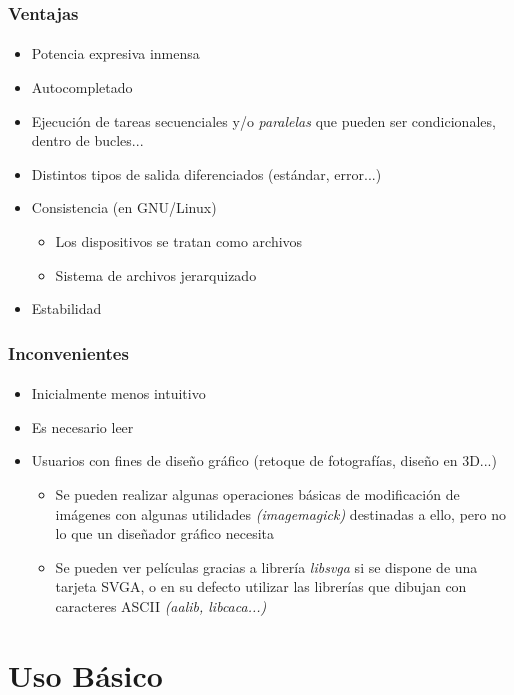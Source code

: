 \documentclass[12pt]{beamer}
\begin{document}
\begin{frame}
  \frametitle{Ventajas}
  \framesubtitle{}
  \begin{itemize}
    \item Potencia expresiva inmensa
    \medskip
    \pause
    \item Autocompletado
    \medskip
    \pause
    \item Ejecución de tareas secuenciales y/o \textit{paralelas} que pueden ser condicionales, dentro de bucles...
    \medskip
    \pause
    \item Distintos tipos de salida diferenciados (estándar, error...)
    \medskip
    \pause
    \item Consistencia (en GNU/Linux)
    \medskip
    \begin{itemize}
      \item Los dispositivos se tratan como archivos
      \medskip
      \item Sistema de archivos jerarquizado
    \end{itemize}
    \medskip
    \pause
    \item Estabilidad
  \end{itemize}
\end{frame}

\begin{frame}
  \frametitle{Inconvenientes}
  \framesubtitle{}
  \begin{itemize}
    \item Inicialmente menos intuitivo
    \medskip
    \pause
    \item Es necesario \alert{leer}
    \medskip
    \pause
    \item Usuarios con fines de diseño gráfico (retoque de fotografías, diseño en 3D...)
    \medskip
    \begin{itemize}
      \pause
      \item Se pueden realizar algunas operaciones básicas de modificación de imágenes con algunas utilidades \textit{(imagemagick)} destinadas a ello, pero no lo que un diseñador gráfico necesita
      \medskip
      \pause
      \item Se pueden ver películas gracias a librería \textit{libsvga} si se dispone de una tarjeta SVGA, o en su defecto utilizar las librerías que dibujan con caracteres ASCII \textit{(aalib, libcaca...)}
    \end{itemize}
  \end{itemize}
\end{frame}


\section{Uso Básico}
\end{document}
